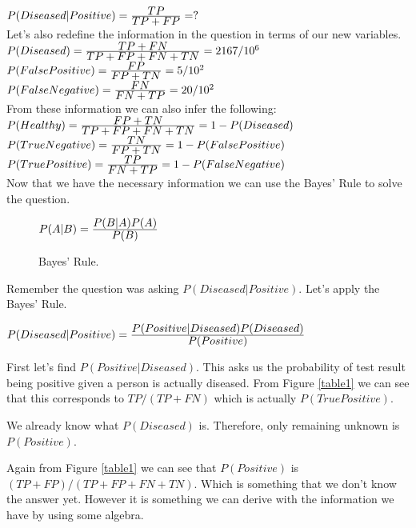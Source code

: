 \documentclass[12pt]{article}
\begin{document}
$P(Diseased|Positive) = \frac{\displaystyle TP}{\displaystyle TP + FP} = ?$ \\


Let's also redefine the information in the question in terms of our new variables. \\


\(P(Diseased) = \frac{\displaystyle TP + FN}{\displaystyle TP + FP + FN + TN} = 2167/10^{6}\) \\

\(P(False Positive) = \frac{\displaystyle FP}{\displaystyle FP + TN} = 5/10^{2}\) \\

\(P(False Negative) = \frac{\displaystyle FN}{\displaystyle FN + TP} = 20/10^{2}\) \\

\pagebreak
From these information we can also infer the following: \\

\(P(Healthy) = \frac{\displaystyle FP + TN}{\displaystyle TP + FP + FN + TN} = 1 - P(Diseased)\) \\

\(P(True Negative) = \frac{\displaystyle TN}{\displaystyle FP + TN} = 1 - P(False Positive)\) \\

\(P(True Positive) = \frac{\displaystyle TP}{\displaystyle FN + TP} = 1 - P(False Negative)\) \\

Now that we have the necessary information we can use the Bayes' Rule to solve the question.

\begin{figure}[h]
    \centering
        $ P(A|B)=\frac{\displaystyle P(B|A)P(A)}{\displaystyle P(B)}$
    \caption{Bayes' Rule.}
    \label{bayesrule}
\end{figure}

Remember the question was asking $P(Diseased|Positive)$. Let's apply the Bayes' Rule. 

\begin{center}
    $ P(Diseased|Positive)=\frac{\displaystyle P(Positive|Diseased)P(Diseased)}{\displaystyle P(Positive)}$
\end{center}

First let's find $P(Positive|Diseased)$. 
This asks us the probability of test result being positive 
given a person is actually diseased. 
From Figure \ref{table1} we can see that this corresponds to $TP /(TP + FN)$ which is actually $P(True Positive)$.

We already know what $P(Diseased)$ is. 
Therefore, only remaining unknown is $P(Positive)$.

Again from Figure \ref{table1} we can see that $P(Positive)$ is $(TP + FP)/(TP + FP + FN + TN)$. 
Which is something that we don't know the answer yet. 
However it is something we can derive with the information we have by using some algebra.\\
\end{document}
